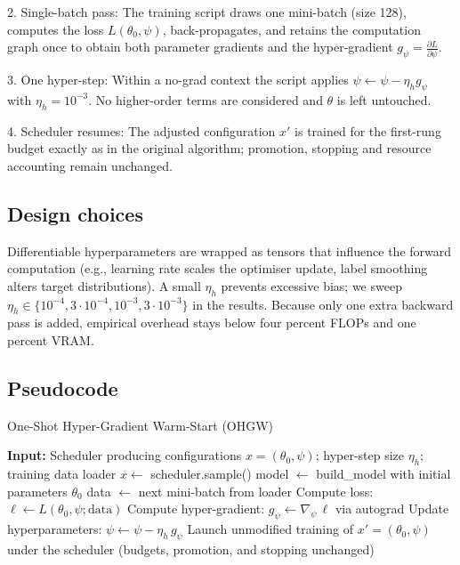 \documentclass{article}
\begin{document}
2. Single-batch pass: The training script draws one mini-batch (size 128), computes the loss \(L(\theta_0,\psi)\), back-propagates, and retains the computation graph once to obtain both parameter gradients and the hyper-gradient \(g_{\psi} = \tfrac{\partial L}{\partial \psi}\).

3. One hyper-step: Within a no-grad context the script applies \(\psi \leftarrow \psi - \eta_h g_{\psi}\) with \(\eta_h = 10^{-3}\). No higher-order terms are considered and \(\theta\) is left untouched.

4. Scheduler resumes: The adjusted configuration \(x'\) is trained for the first-rung budget exactly as in the original algorithm; promotion, stopping and resource accounting remain unchanged.

\subsection{Design choices}
Differentiable hyperparameters are wrapped as tensors that influence the forward computation (e.g., learning rate scales the optimiser update, label smoothing alters target distributions). A small \(\eta_h\) prevents excessive bias; we sweep \(\eta_h\in\{10^{-4}, 3\cdot10^{-4}, 10^{-3}, 3\cdot10^{-3}\}\) in the results. Because only one extra backward pass is added, empirical overhead stays below four percent FLOPs and one percent VRAM.

\subsection{Pseudocode}
\begin{algorithm}[H]
\caption{One-Shot Hyper-Gradient Warm-Start (OHGW)}
\begin{algorithmic}
    \State \textbf{Input:} Scheduler producing configurations \(x=(\theta_0,\psi)\); hyper-step size \(\eta_h\); training data loader
        \State \(x\gets\) scheduler.sample()
        \State model \(\gets\) build\_model with initial parameters \(\theta_0\)
        \State data \(\gets\) next mini-batch from loader
        \State Compute loss: \(\ell \gets L(\theta_0, \psi; \text{data})\)
        \State Compute hyper-gradient: \(g_{\psi} \gets \nabla_{\psi} \, \ell\) via autograd
        \State Update hyperparameters: \(\psi \gets \psi - \eta_h \, g_{\psi}\)
        \State Launch unmodified training of \(x'=(\theta_0,\psi)\) under the scheduler (budgets, promotion, and stopping unchanged)
    \EndWhile
\end{algorithmic}
\end{algorithm}
\end{document}
